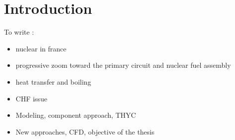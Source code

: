 
\chapter{Introduction} %

\label{ch:introduction} %


To write :

\begin{itemize}
\item nuclear in france
\item progressive zoom toward the primary circuit and nuclear fuel assembly
\item heat transfer and boiling
\item CHF issue
\item Modeling, component approach, THYC
\item New approaches, CFD, objective of the thesis
\end{itemize}